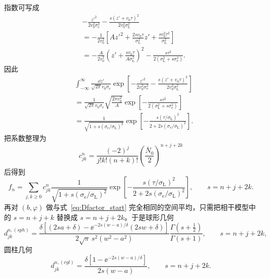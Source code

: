 指数可写成
\begin{align}
&-\frac{z'^2}{2v_0^2\sigma_{\mathrm e}^2}
-\frac{s(z'+v_0\tau)^2}{2v_0^2\sigma_{\mathrm L}^2}\\
&=-\frac{1}{2v_0^2}
\left[
Az'^2+\frac{2sv_0\tau}{\sigma_{\mathrm L}^2}z'
+\frac{sv_0^2\tau^2}{\sigma_{\mathrm L}^2}
\right]\\
&=-\frac{A}{2v_0^2}
\left(z'+\frac{sv_0\tau}{A\sigma_{\mathrm L}^2}\right)^2
-\frac{s\tau^2}{2(\sigma_{\mathrm L}^2+s\sigma_{\mathrm e}^2)}.
\end{align}
因此
\begin{align}
&\int_{-\infty}^{\infty}
\frac{\dd z'}{\sqrt{2\pi}v_0\sigma_{\mathrm e}}
\exp\!\left[-\frac{z'^2}{2v_0^2\sigma_{\mathrm e}^2}
-\frac{s(z'+v_0\tau)^2}{2v_0^2\sigma_{\mathrm L}^2}\right]\\
&=\frac{1}{\sqrt{2\pi}v_0\sigma_{\mathrm e}}
\sqrt{\frac{2\pi v_0^2}{A}}
\exp\!\left[-\frac{s\tau^2}{2(\sigma_{\mathrm L}^2+s\sigma_{\mathrm e}^2)}\right]\\
&=\frac{1}{\sqrt{1+s(\sigma_{\mathrm e}/\sigma_{\mathrm L})^2}}
\exp\!\left[
-\frac{s(\tau/\sigma_{\mathrm L})^2}
{2+2s(\sigma_{\mathrm e}/\sigma_{\mathrm L})^2}
\right].
\label{eq:incoherent-gaussian-integral-explicit}
\end{align}
把系数整理为
\begin{equation}
\boxed{
c_{jk}^n
=\frac{(-2)^j}{j!k!(n+k)!}
\left(\frac{\bar N_0}{2}\right)^{n+j+2k}}
\label{eq:cnjk_incoherent}
\end{equation}
后得到
\begin{equation}
\boxed{
f_n
=\sum_{j,k\ge0}c_{jk}^n
\frac{1}{\sqrt{1+s(\sigma_{\mathrm e}/\sigma_{\mathrm L})^2}}
\exp\!\left[
-\frac{s(\tau/\sigma_{\mathrm L})^2}
{2+2s(\sigma_{\mathrm e}/\sigma_{\mathrm L})^2}
\right],
\qquad s=n+j+2k.}
\label{eq:incoherent-delay-series}
\end{equation}
再对 \((b,\varphi)\) 做与式~\eqref{eq:Dfactor_start} 完全相同的空间平均，只需把相干模型中的
\(
s=n+j+k
\)
替换成
\(
s=n+j+2k
\)。于是球形几何
\begin{equation}
\boxed{
d_{jk}^{n,(sph)}=
\frac{\delta\left[(2sa+\delta)-
\ee^{-2s(w-a)/\delta}(2sw+\delta)\right]}
{2\sqrt\pi\,s^2(w^2-a^2)}
\frac{\Gamma(s+\frac12)}{\Gamma(s+1)},
\qquad s=n+j+2k,}
\label{eq:d_incoherent_sphere}
\end{equation}
圆柱几何
\begin{equation}
\boxed{
d_{jk}^{n,(cyl)}=
\frac{\delta[1-\ee^{-2s(w-a)/\delta}]}
{2s(w-a)},
\qquad s=n+j+2k.}
\label{eq:d_incoherent_cyl}
\end{equation}
